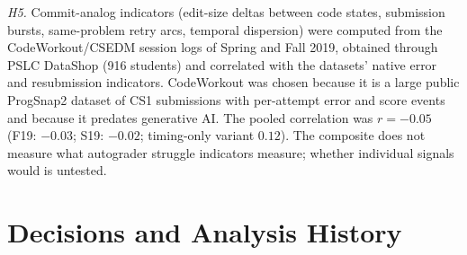 \documentclass[acmsmall,screen,review,anonymous]{acmart}
\begin{document}
\textit{H5.} Commit-analog indicators (edit-size deltas between code states, submission bursts, same-problem retry arcs, temporal dispersion) were computed from the CodeWorkout/\allowbreak CSEDM session logs of Spring and Fall 2019, obtained through PSLC DataShop \citep{codeworkout2020dataset} (916 students) and correlated with the datasets' native error and resubmission indicators. CodeWorkout was chosen because it is a large public ProgSnap2 dataset of CS1 submissions with per-attempt error and score events and because it predates generative AI. The pooled correlation was $r = -0.05$ (F19: $-0.03$; S19: $-0.02$; timing-only variant $0.12$). The composite does not measure what autograder struggle indicators measure; whether individual signals would is untested.

\FloatBarrier
\section{Decisions and Analysis History}
\label{app:history}
\label{app:decisions}
\end{document}
